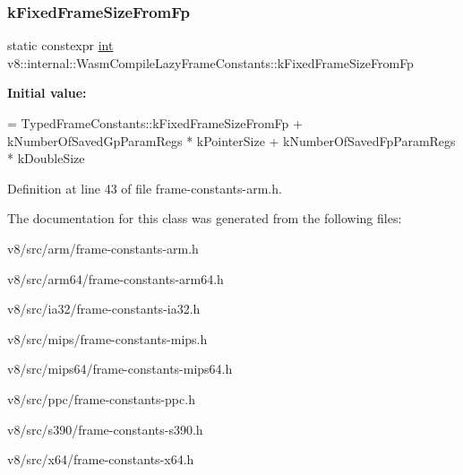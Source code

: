 \subsubsection{\texorpdfstring{k\+Fixed\+Frame\+Size\+From\+Fp}{kFixedFrameSizeFromFp}}
{\footnotesize\ttfamily static constexpr \mbox{\hyperlink{classint}{int}} v8\+::internal\+::\+Wasm\+Compile\+Lazy\+Frame\+Constants\+::k\+Fixed\+Frame\+Size\+From\+Fp\hspace{0.3cm}{\ttfamily [static]}}

{\bfseries Initial value\+:}
\begin{DoxyCode}
=
      TypedFrameConstants::kFixedFrameSizeFromFp +
      kNumberOfSavedGpParamRegs * kPointerSize +
      kNumberOfSavedFpParamRegs * kDoubleSize
\end{DoxyCode}


Definition at line 43 of file frame-\/constants-\/arm.\+h.



The documentation for this class was generated from the following files\+:\begin{DoxyCompactItemize}
\item 
v8/src/arm/frame-\/constants-\/arm.\+h\item 
v8/src/arm64/frame-\/constants-\/arm64.\+h\item 
v8/src/ia32/frame-\/constants-\/ia32.\+h\item 
v8/src/mips/frame-\/constants-\/mips.\+h\item 
v8/src/mips64/frame-\/constants-\/mips64.\+h\item 
v8/src/ppc/frame-\/constants-\/ppc.\+h\item 
v8/src/s390/frame-\/constants-\/s390.\+h\item 
v8/src/x64/frame-\/constants-\/x64.\+h\end{DoxyCompactItemize}
